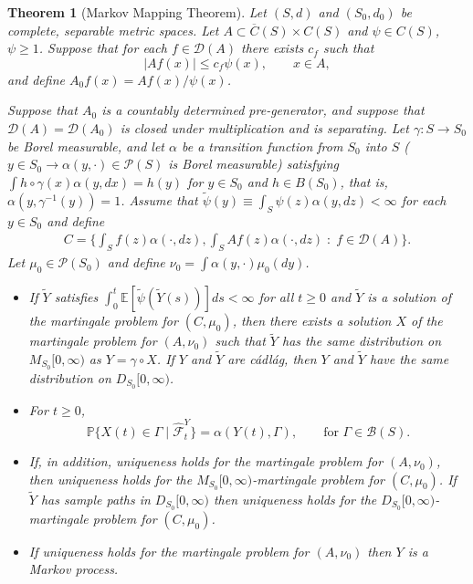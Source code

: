 \documentclass[12pt]{article}
\newtheorem{theorem}{Theorem}[section]
\def \hat{\widehat}
\def \tilde{\widetilde}
\def \bar{\overline}
\newcommand{\IP}{\mathbb P}
\newcommand{\IE}{\mathbb E}
\numberwithin{equation}{section}
\begin{document}
\begin{theorem}[Markov Mapping Theorem] \label{thm:mmt}
    Let $(S,d)$ and $(S_0,d_0)$ be complete, separable metric spaces.
    Let $A \subset \bar C(S) \times C(S)$ and $\psi \in C(S)$, $\psi \ge 1$.
    Suppose that for each $f \in \mathcal{D}(A)$ there exists $c_f$
    such that
    $$ |Af(x)| \le c_f \psi(x), \qquad x \in A, $$
    and define $A_0 f(x) = Af(x) / \psi(x)$.

    Suppose that $A_0$ is a countably determined pre-generator,
    and suppose that $\mathcal{D}(A) = \mathcal{D}(A_0)$
    is closed under multiplication and is separating.
    Let $\gamma : S \to S_0$ be Borel measurable,
    and let $\alpha$ be a transition function from $S_0$ into $S$
    ($y \in S_0 \to \alpha(y,\cdot)\in\mathcal{P}(S)$ is Borel measurable)
    satisfying $\int h\circ\gamma(x)\alpha(y,dx) = h(y)$ for $y \in S_0$ and $h \in B(S_0)$,
    that is, $\alpha(y,\gamma^{-1}(y)) = 1$.
    Assume that $\tilde \psi(y) \equiv \int_S \psi(z) \alpha(y,dz) < \infty$ for each $y \in S_0$
    and define
    \begin{align} \label{eqn:C_defn}
        C = \{
        \int_S f(z) \alpha(\cdot,dz),
        \int_S Af(z) \alpha(\cdot,dz)
        \; : \; f \in \mathcal{D}(A)
    \} . \end{align}
    Let $\mu_0 \in \mathcal{P}(S_0)$ and define $\nu_0 = \int \alpha(y,\cdot) \mu_0(dy)$.
    \begin{itemize}
        \item[(a)]
            If $\tilde Y$ satisfies $\int_0^t \IE[\tilde \psi(\tilde Y(s))]ds < \infty$
            for all $t \ge 0$ and $\tilde Y$ is a solution of the martingale problem for $(C,\mu_0)$,
            then there exists a solution $X$ of the martingale problem for $(A,\nu_0)$
            such that $\tilde Y$ has the same distribution on $M_{S_0}[0,\infty)$
            as $Y = \gamma \circ X$.
            If $Y$ and $\tilde Y$ are c\'adl\'ag, then $Y$ and $\tilde Y$ have the same distribution
            on $D_{S_0}[0,\infty)$.
        \item[(b)]
            For $t \ge 0$,
            $$ \IP\{ X(t) \in \Gamma \;|\; \hat{\mathcal{F}}^Y_t \}
            = \alpha(Y(t),\Gamma), \qquad \text{for } \Gamma \in \mathcal{B}(S).
            $$
        \item[(c)]
            If, in addition, uniqueness holds for the martingale problem for $(A,\nu_0)$,
            then uniqueness holds for the $M_{S_0}[0,\infty)$-martingale problem for $(C,\mu_0)$.
            If $\tilde Y$ has sample paths in $D_{S_0}[0,\infty)$ then uniqueness holds for the
            $D_{S_0}[0,\infty)$-martingale problem for $(C,\mu_0)$.
        \item[(d)]
            If uniqueness holds for the martingale problem for $(A,\nu_0)$
            then $Y$ is a Markov process.
    \end{itemize}
\end{theorem}
\end{document}
